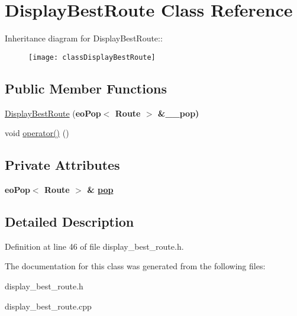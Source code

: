 \hypertarget{classDisplayBestRoute}{
\section{Display\-Best\-Route Class Reference}
\label{classDisplayBestRoute}
}
Inheritance diagram for Display\-Best\-Route::\begin{figure}[H]
\begin{center}
\leavevmode
\texttt{[image: classDisplayBestRoute]}
\end{center}
\end{figure}
\subsection*{Public Member Functions}
\begin{CompactItemize}
\item 
\hypertarget{classDisplayBestRoute_db263e38f1e82174f811bf62f323f87f}{
\hyperlink{classDisplayBestRoute_db263e38f1e82174f811bf62f323f87f}{Display\-Best\-Route} (\bf{eo\-Pop}$<$ \bf{Route} $>$ \&\_\-\_\-pop)}
\label{classDisplayBestRoute_db263e38f1e82174f811bf62f323f87f}

\item 
\hypertarget{classDisplayBestRoute_ee879344a6d8b81a04d4eabbed2c7a04}{
void \hyperlink{classDisplayBestRoute_ee879344a6d8b81a04d4eabbed2c7a04}{operator()} ()}
\label{classDisplayBestRoute_ee879344a6d8b81a04d4eabbed2c7a04}

\end{CompactItemize}
\subsection*{Private Attributes}
\begin{CompactItemize}
\item 
\hypertarget{classDisplayBestRoute_5270aabbf294d2deca9878934216eb89}{
\bf{eo\-Pop}$<$ \bf{Route} $>$ \& \hyperlink{classDisplayBestRoute_5270aabbf294d2deca9878934216eb89}{pop}}
\label{classDisplayBestRoute_5270aabbf294d2deca9878934216eb89}

\end{CompactItemize}


\subsection{Detailed Description}




Definition at line 46 of file display\_\-best\_\-route.h.

The documentation for this class was generated from the following files:\begin{CompactItemize}
\item 
display\_\-best\_\-route.h\item 
display\_\-best\_\-route.cpp\end{CompactItemize}
